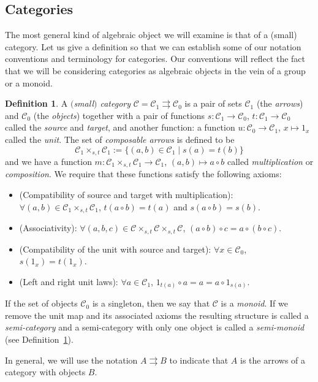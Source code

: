 \documentclass[pdftex]{sigma}
\numberwithin{equation}{section}
\theoremstyle{definition}
\newtheorem{Definition}[Theorem]{Definition}
\newcommand{\CC}{\mathcal{C}}
\newcommand{\grpd}{\rightrightarrows}
\begin{document}
\subsection{Categories}
The most general kind of algebraic object we will examine is that of a (small) category. Let us give a definition so that we can establish some of our notation conventions and terminology for categories. Our conventions will reflect the fact that we will be considering categories as algebraic objects in the vein of a group or a monoid.
\begin{Definition}\label{def:category}
  A \emph{$($small$)$ category} $ \CC = \CC_1 \grpd \CC_0 $ is a pair of sets $\CC_1 $ (the \emph{arrows}) and $\CC_0 $ (the \emph{objects}) together with a pair of functions
  $s \colon \CC_1 \to \CC_0$, $t \colon \CC_1 \to \CC_0$
  called the \emph{source} and \emph{target}, and another function:
  a function
  $u \colon \CC_0 \to \CC_1$, $x \mapsto 1_x$
  called the \emph{unit}. The set of \emph{composable arrows} is defined to be
  \[ \CC_1 \times_{s,t} \CC_1 := \{ (a,b) \in \CC_1 \mid s(a) = t(b) \} \]
  and we have a function
  $m \colon \CC_1 \times_{s,t} \CC_1 \to \CC_1$, $(a,b) \mapsto a \circ b$
  called \emph{multiplication} or \emph{composition}. We require that these functions satisfy the following axioms:
  \begin{itemize}\itemsep=0pt
    \item (Compatibility of source and target with multiplication):
    $\forall (a,b) \in \CC_1 \times_{s,t} \CC_1$, $ t( a \circ b) = t(a) $ and $ s(a \circ b ) = s(b)$.
    \item (Associativity):
    $\forall (a,b,c ) \in \CC \times_{s,t} \CC \times_{s,t} \CC$, $ (a \circ b) \circ c = a \circ (b \circ c)$.
    \item (Compatibility of the unit with source and target):
    $\forall x \in \CC_0$, $ s(1_x) = t(1_x)$.
    \item (Left and right unit laws):
   $\forall a \in \CC_1$, $ 1_{t(a)} \circ a = a  = a \circ 1_{s(a)}$.
  \end{itemize}
   If the set of objects $ \CC_0 $ is a singleton, then we say that $ \CC $ is a \emph{monoid}. If we remove the unit map and its associated axioms the resulting structure is called a \emph{semi-category} and a semi-category with only one object is called a \emph{semi-monoid} (see Definition~\ref{def:category}).
\end{Definition}
In general, we will use the notation $ A \grpd B $ to indicate that $ A$ is the arrows of a category with objects $ B $.
\end{document}

